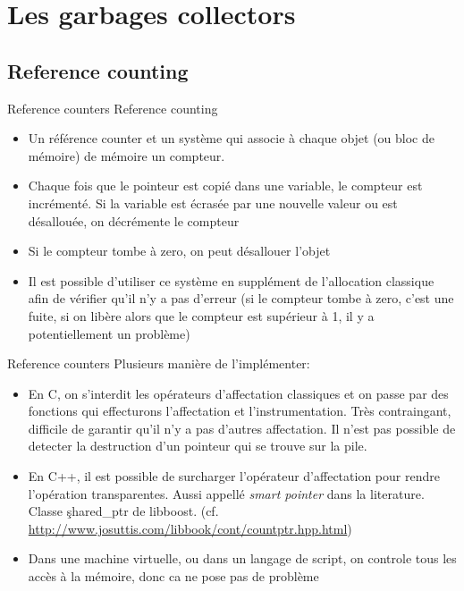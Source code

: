 \section{Les garbages collectors}

\subsection{Reference counting}

\begin{frame}[fragile=singleslide]{Reference counters}
 Reference counting
    \begin{itemize}
    \item  Un référence  counter et  un système  qui associe  à chaque
      objet (ou bloc de mémoire) de mémoire un compteur.
    \item Chaque fois que le  pointeur est copié dans une variable, le
      compteur  est incrémenté.  Si la  variable est  écrasée  par une
      nouvelle valeur ou est désallouée, on décrémente le compteur
    \item Si le compteur tombe à zero, on peut désallouer l'objet
    \item  Il est  possible  d'utiliser ce  système  en supplément  de
      l'allocation classique afin de vérifier qu'il n'y a pas d'erreur
      (si  le compteur tombe  à zero,  c'est une  fuite, si  on libère
      alors que le compteur est  supérieur à 1, il y a potentiellement
      un problème)
    \end{itemize}
  \end{frame}

\begin{frame}[fragile=singleslide]{Reference counters}
  Plusieurs manière de l'implémenter:
  \begin{itemize}
  \item En C, on s'interdit les opérateurs d'affectation classiques et
    on  passe  par  des  fonctions qui  effecturons  l'affectation  et
    l'instrumentation.  Très contraingant, difficile de garantir qu'il
    n'y a pas d'autres affectation.  Il n'est pas possible de detecter
    la destruction d'un pointeur qui se trouve sur la pile.
  \item   En  C++,   il   est  possible   de  surcharger   l'opérateur
    d'affectation   pour  rendre  l'opération   transparentes.   Aussi
    appellé   \emph{smart  pointer}   dans   la  literature.    Classe
    \c{shared_ptr}            de            libboost.             (cf.
    \url{http://www.josuttis.com/libbook/cont/countptr.hpp.html})
  \item Dans une  machine virtuelle, ou dans un  langage de script, on
    controle  tous les  accès à  la mémoire,  donc ca  ne pose  pas de
    problème
  \end{itemize}
\end{frame}

